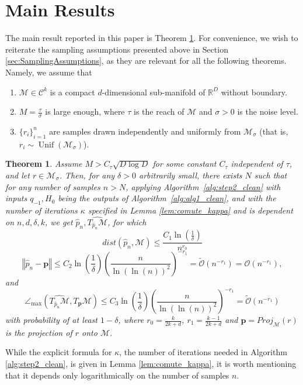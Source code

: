 \documentclass[12pt]{article}
\newtheorem{Theorem}{Theorem}[section]
\theoremstyle{remark}
\newcommand{\RR}{\mathbb{R}}
\newcommand{\MM}{\mathcal{M}}
\newcommand{\C}{\mathcal{C}}
\newcommand{\norm}[1]{\left\Vert #1 \right\Vert}
\newcommand{\wtilde}[1]{\widetilde{#1}}
\newcommand{\stau}{\tau}
\begin{document}
\section{Main Results} \label{sec:mainResults}
The main result reported in this paper is Theorem \ref{thm:MainResult}.
For convenience, we wish to reiterate the sampling assumptions presented above in Section \ref{sec:SamplingAssumptions}, as they are relevant for all the following theorems.
Namely, we assume that 
\begin{enumerate}
	\item[i] $\MM\in\C^k$ is a compact $d$-dimensional sub-manifold of $\RR^D$ without boundary.
	\item[ii] $M = \frac{\tau}{\sigma}$ is large enough, where $\tau$ is the reach of $\MM$ and $\sigma>0$ is the noise level. 
	\item[iii] $\{r_i\}_{i=1}^n$ are samples drawn independently and uniformly from $\MM_\sigma$ (that is, $r_i\sim \operatorname{Unif}(\MM_\sigma)$).
\end{enumerate}



\begin{Theorem}\label{thm:MainResult}
	Assume $M > C_\stau \sqrt{D\log D}$ for some constant $C_\stau$ independent of $\tau$, and let $r\in \MM_\sigma$.
	Then, for any $\delta>0$ arbitrarily small, there exists $ N $ such that for any number of samples $ n > N $,
	applying Algorithm~\ref{alg:step2_clean} with inputs $q_{-1}, H_0$ being the outputs of Algorithm~\ref{alg:alg1_clean}, and with the number of iterations $\kappa$ specified in Lemma \ref{lem:comute_kappa} and is dependent on $n,d, \delta, k$, we get $ \hat p_n, \widehat{T_{\hat p_n}\MM} $, for which 
	\[
	dist(\hat p_n, \MM) \leq \frac{C_1\ln\left(\frac{1}{\delta}\right)}{n^{r_0}}
	\]
	\[
	\norm{\hat p_n - \mathbf{p}} \leq C_2\ln\left(\frac{1}{\delta}\right) \left(\frac{ n}{\ln\left(\ln(n) \right)^2}\right)^{-r_1} = \wtilde{\mathcal{O}}(n^{-r_1}) = \mathcal{O}(n^{-r_1})
	,\]
	and 
	\[
	\angle_{\max}(\widehat{T_{\hat p_n}\MM},T_{\mathbf{p}}\MM) \leq  C_3\ln\left(\frac{1}{\delta}\right) \left(\frac{ n}{\ln\left(\ln(n) \right)^2}\right)^{-r_1} = \wtilde{\mathcal{O}}(n^{-r_1}) 
	\]
	with probability of at least $ 1 - \delta $, where $ r_0 = \frac{k}{2k +d} $, $ r_1 = \frac{k-1}{2k +d} $ and $\mathbf{p} = Proj_\MM (r)$ is the projection of $r$ onto $\MM$.
\end{Theorem}

While the explicit formula for $\kappa$, the number of iterations needed in Algorithm \ref{alg:step2_clean}, is given in Lemma \ref{lem:comute_kappa}, it is worth mentioning that it depends only logarithmically on the number of samples $n$.
\end{document}
